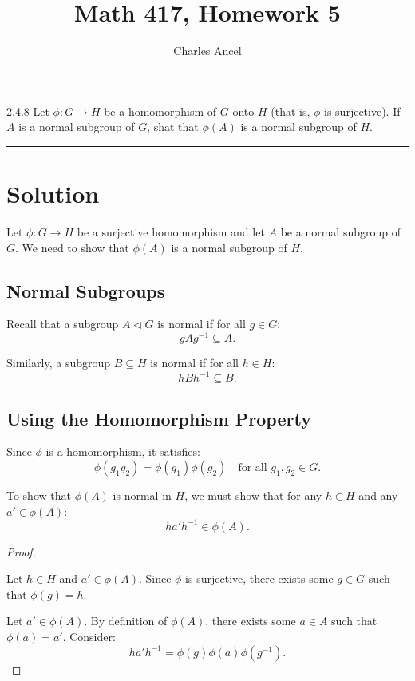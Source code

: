 \documentclass[12pt]{amsart}
\title{Math 417, Homework 5}
\author{Charles Ancel}
\theoremstyle{definition}
\numberwithin{equation}{section}
\begin{document}
\maketitle

\begin{exercise}{2.4.8} Let \(\phi : G \rightarrow H\) be a homomorphism of $G$ onto $H$ (that is, \(\phi\) is surjective). If $A$ is a normal subgroup of $G$, shat that \(\phi(A)\) is a normal subgroup of $H$.

    \noindent\rule{\linewidth}{1pt}
    
    
    \section*{Solution}

    Let \(\phi : G \rightarrow H\) be a surjective homomorphism and let \(A\) be a normal subgroup of \(G\). We need to show that \(\phi(A)\) is a normal subgroup of \(H\).
    
    \subsection*{Normal Subgroups}
    
    Recall that a subgroup \(A \triangleleft G\) is normal if for all \(g \in G\):
    \[
    gAg^{-1} \subseteq A.
    \]
    
    Similarly, a subgroup \(B \subseteq H\) is normal if for all \(h \in H\):
    \[
    hBh^{-1} \subseteq B.
    \]
    
    \subsection*{Using the Homomorphism Property}
    
    Since \(\phi\) is a homomorphism, it satisfies:
    \[
    \phi(g_1 g_2) = \phi(g_1) \phi(g_2) \quad \text{for all } g_1, g_2 \in G.
    \]
    
    To show that \(\phi(A)\) is normal in \(H\), we must show that for any \(h \in H\) and any \(a' \in \phi(A)\):
    \[
    h a' h^{-1} \in \phi(A).
    \]
    
    \begin{proof} \( \)
        
        Let \(h \in H\) and \(a' \in \phi(A)\). Since \(\phi\) is surjective, there exists some \(g \in G\) such that \(\phi(g) = h\).
        
        Let \(a' \in \phi(A)\). By definition of \(\phi(A)\), there exists some \(a \in A\) such that \(\phi(a) = a'\). Consider:
        \[
        h a' h^{-1} = \phi(g) \phi(a) \phi(g^{-1}).
        \]
        

\end{proof}
\end{exercise}
\end{document}
